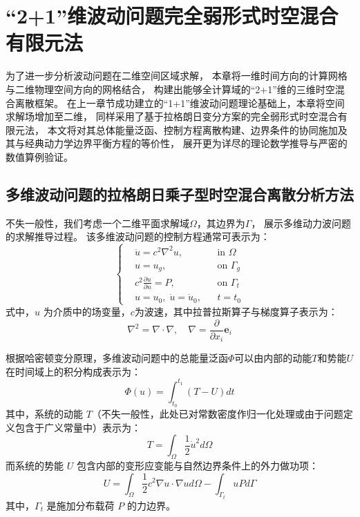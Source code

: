 ﻿\chapter{“2+1”维波动问题完全弱形式时空混合有限元法}
为了进一步分析波动问题在二维空间区域求解，
本章将一维时间方向的计算网格与二维物理空间方向的网格结合，
构建出能够全计算域的“2+1”维的三维时空混合离散框架。
在上一章节成功建立的“1+1”维波动问题理论基础上，本章将空间求解场增加至二维，
同样采用了基于拉格朗日变分方案的完全弱形式时空混合有限元法，
本文将对其总体能量泛函、控制方程离散构建、边界条件的协同施加及其与经典动力学边界平衡方程的等价性，
展开更为详尽的理论数学推导与严密的数值算例验证。

\section{多维波动问题的拉格朗日乘子型时空混合离散分析方法}

不失一般性，我们考虑一个二维平面求解域$\Omega$，其边界为$\Gamma$，
展示多维动力波问题的求解推导过程。
该多维波动问题的控制方程通常可表示为：
\begin{equation}\label{eq:bdfc3d}
    \left \{
    \begin{aligned}
        & \ddot u = c^2 \nabla^2 u, &&  \text{in } \Omega  \\
        & u = u_g, && \text{on } \Gamma_g \\
        & c^2 \frac{\partial u}{\partial n} = P, && \text{on } \Gamma_t \\
        & u = u_0, \; \dot u= \dot u_0, && t=t_0
    \end{aligned}
    \right .
\end{equation}
式中，$u$ 为介质中的场变量，$c$为波速，其中拉普拉斯算子与梯度算子表示为：
\begin{equation}
    \nabla^2 = \nabla \cdot \nabla, \quad
    \nabla = \frac{\partial }{\partial x_i} \boldsymbol e_i
\end{equation}

根据哈密顿变分原理，多维波动问题中的总能量泛函$\Phi$可以由内部的动能$T$和势能$U$在时间域上的积分构成表示为：
\begin{equation}
    \Phi(u) = \int_{t_0}^{t_1} (T - U) dt
\end{equation}
其中，系统的动能 $T$（不失一般性，此处已对常数密度作归一化处理或由于问题定义包含于广义常量中）表示为：
\begin{equation}\label{T_3d}
    T = \int_{\Omega} \frac{1}{2} \dot u^2 d\Omega
\end{equation}
而系统的势能 $U$ 包含内部的变形应变能与自然边界条件上的外力做功项：
\begin{equation}\label{U_3d}
    U = \int_{\Omega} \frac{1}{2} c^2 \nabla u \cdot \nabla u d\Omega
    - \int_{\Gamma_t} u P d\Gamma
\end{equation}
其中，$\Gamma_t$ 是施加分布载荷 $P$ 的力边界。

